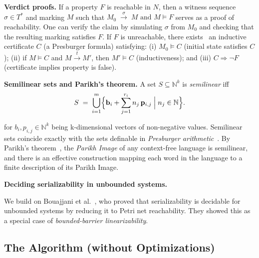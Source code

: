 \medskip
\noindent
\textbf{Verdict proofs.} 
%
If a property $F$ is reachable in $N$, then a witness sequence $\sigma \in T^*$ and marking $M$ such that $ M_0 \;\xrightarrow{\sigma}\; M \text{ and }M \models F$
serves as a proof of reachability. One can verify the claim by simulating $\sigma$ from $M_0$ and checking that the resulting marking satisfies $F$.
%
If $F$ is unreachable, there exists~\cite{Le09} an inductive certificate $C$ (a Presburger formula) satisfying:
(i) $M_0 \models C$ (initial state satisfies $C$);
(ii) if $M \models C$ and $M \xrightarrow{t} M'$, then $M' \models C$ (inductiveness); and
(iii) $C \Rightarrow \neg F$ (certificate implies property is false).

%

\medskip
\noindent
\textbf{Semilinear sets and Parikh’s theorem.}
A set \(S\subseteq\mathbb N^k\) is \emph{semilinear} iff
\[
S \;=\; \bigcup_{i=1}^m \Bigl\{\mathbf b_i + \sum_{j=1}^{r_i} n_j\,\mathbf p_{i,j}
\;\Big|\; n_j\in\mathbb N\Bigr\}.
\]

for $b_i, p_{i,j}\in \mathbb N^k$ being k-dimensional vectors of non-negative values.
%
Semilinear sets coincide exactly with the sets definable in \textit{Presburger arithmetic}~\cite{Pr29}.
%
By Parikh's theorem~\cite{Parikh66}, the \textit{Parikh Image} of any context-free language is semilinear, and there is an effective construction mapping each word in the language to a
finite description of its Parikh Image.

\medskip
\noindent
\textbf{Deciding serializability in unbounded systems.}

We build on Bouajjani et al.~\cite{BoEmEnHa13}, who proved that serializability is decidable for unbounded systems by reducing it to Petri net reachability. They showed this as a special case of \textit{bounded-barrier linearizability}.



\subsection{The Algorithm (without Optimizations)}

